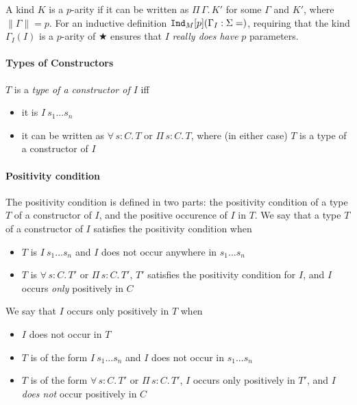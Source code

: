 \documentclass{article}
\newcommand{\abs}[4]{{#1}\, #2\! : \! #3.\, #4}
\newcommand{\absu}[3]{{#1}\, #2.\, #3}
\newcommand{\indast}[5]{\texttt{Ind}_{#1} [#2] (#3 : #4 = #5)}
\newcommand{\lenc}[1]{\|#1\|}
\newcommand{\piforall}{^{\Pi}_{\forall}}
\begin{document}
A kind $K$ is a $p$-arity if it can be written as $\absu{\Pi}{\Gamma}{K'}$ for
some $\Gamma$ and $K'$, where $\lenc{\Gamma} = p$. For an inductive definition
$\indast{M}{p}{\Gamma_I}{\Sigma}$, requiring that the kind $\Gamma_{I}(I)$ is a $p$-arity
of ★ ensures that $I$ \textit{really does have} $p$ parameters.

\paragraph{Types of Constructors}
$T$ is a \textit{type of a constructor of $I$} iff
\begin{itemize}
\item it is $I\ s_1 ... s_n$
\item it can be written as $\abs{\forall}{s}{C}{T}$ or $\abs{\Pi}{s}{C}{T}$,
  where (in either case) $T$ is a type of a constructor of $I$
\end{itemize}

\paragraph{Positivity condition}
The positivity condition is defined in two parts: the positivity condition of
a type $T$ of a constructor of $I$, and the positive occurence of $I$ in $T$.
We say that a type $T$ of a constructor of $I$ satisfies the positivity condition
when

\begin{itemize}
\item $T$ is $I\ s_1... s_n$ and $I$ does not occur anywhere in $s_1...s_n$
\item $T$ is $\abs{\forall}{s}{C}{T'}$ or $\abs{\Pi}{s}{C}{T'}$, $T'$ satisfies
  the positivity condition for $I$, and $I$ occurs \textit{only} positively in $C$ 
\end{itemize}

\noindent We say that $I$ occurs only positively in $T$ when
\begin{itemize}
\item $I$ does not occur in $T$
\item $T$ is of the form $I\ s_1 ... s_n$ and $I$ does not occur in $s_1 ...
  s_n$
\item $T$ is of the form $\abs{\forall}{s}{C}{T'}$ or $\abs{\Pi}{s}{C}{T'}$, $I$
  occurs only positively in $T'$, and $I$ \textit{does not} occur positively in $C$
\end{itemize}
\end{document}
